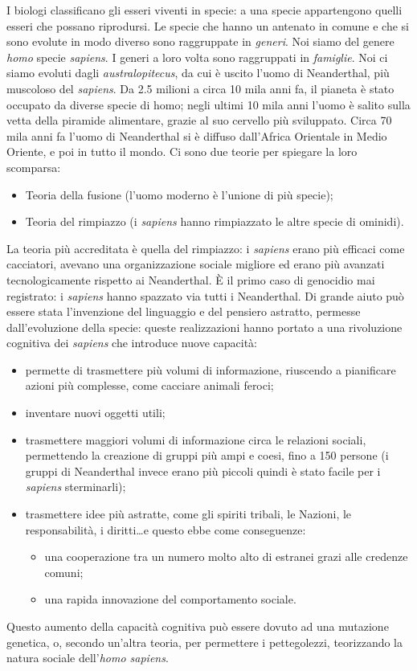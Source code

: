 \documentclass[a4page, 11pt]{article}
\begin{document}
I biologi classificano gli esseri viventi in specie: a una specie appartengono quelli esseri che possano riprodursi.
Le specie che hanno un antenato in comune e che si sono evolute in modo diverso sono raggruppate in \textit{generi}.
Noi siamo del genere \textit{homo} specie \textit{sapiens}.
I generi a loro volta sono raggruppati in \textit{famiglie}.
Noi ci siamo evoluti dagli \textit{australopitecus}, da cui è uscito l'uomo di Neanderthal, più muscoloso del \textit{sapiens}.
Da 2.5 milioni a circa 10 mila anni fa, il pianeta è stato occupato da diverse specie di homo; negli ultimi 10 mila anni l'uomo è salito sulla vetta della piramide alimentare, grazie al suo cervello più sviluppato.
Circa 70 mila anni fa l'uomo di Neanderthal si è diffuso dall'Africa Orientale in Medio Oriente, e poi in tutto il mondo.
Ci sono due teorie per spiegare la loro scomparsa:
\begin{itemize}
  \item Teoria della fusione (l'uomo moderno è l'unione di più specie);
  \item	Teoria del rimpiazzo (i \textit{sapiens} hanno rimpiazzato le altre specie di ominidi).
\end{itemize}
La teoria più accreditata è quella del rimpiazzo: i \textit{sapiens} erano più efficaci come cacciatori, avevano una organizzazione sociale migliore ed erano più avanzati tecnologicamente rispetto ai Neanderthal.
È il primo caso di genocidio mai registrato: i \textit{sapiens} hanno spazzato via tutti i Neanderthal.
Di grande aiuto può essere stata l'invenzione del linguaggio e del pensiero astratto, permesse dall'evoluzione della specie: queste realizzazioni hanno portato a una rivoluzione cognitiva dei \textit{sapiens} che introduce nuove capacità:
\begin{itemize}
  \item permette di trasmettere più volumi di informazione, riuscendo a pianificare azioni più complesse, come cacciare animali feroci;
  \item inventare nuovi oggetti utili;
  \item trasmettere maggiori volumi di informazione circa le relazioni sociali, permettendo la creazione di gruppi più ampi e coesi, fino a 150 persone (i gruppi di Neanderthal invece erano più piccoli quindi è stato facile per i \textit{sapiens} sterminarli);
  \item trasmettere idee più astratte, come gli spiriti tribali, le Nazioni, le responsabilità, i diritti\ldots e questo ebbe come conseguenze:
  \begin{itemize}
    \item una cooperazione tra un numero molto alto di estranei grazi alle credenze comuni;
    \item una rapida innovazione del comportamento sociale.
  \end{itemize}
\end{itemize}
Questo aumento della capacità cognitiva può essere dovuto ad una mutazione genetica, o, secondo un'altra teoria, per permettere i pettegolezzi, teorizzando la natura sociale dell'\textit{homo sapiens}.
\end{document}
